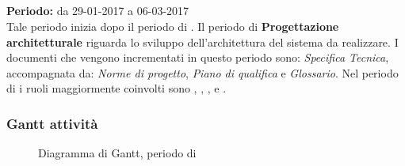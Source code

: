\subsection{\PA{}}
\textbf{Periodo:} da 29-01-2017 a 06-03-2017 \\
Tale periodo inizia dopo il periodo di \AD{}. Il periodo di \textbf{Progettazione architetturale} riguarda lo sviluppo dell'architettura del sistema da realizzare. I documenti che vengono incrementati in questo periodo sono: \textit{Specifica Tecnica}, accompagnata da: \textit{Norme di progetto}, \textit{Piano di qualifica} e \textit{Glossario}.
Nel periodo di \PA{} i ruoli maggiormente coinvolti sono \Progettista{}, \Responsabile{}, \Amministratore{}, \Analista{} e \Verificatore{}.
\subsubsection{Gantt attività}
\begin{figure}[H]
	\centering
	\caption{Diagramma di Gantt, periodo di \PA{}}
\end{figure}

